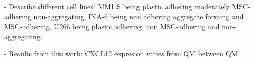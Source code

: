 






% 

\unnsubsection{\cadddiversitytitle}%
\label{sec:discussion_cadddiversity}%

- Describe different cell lines: MM1.S being plastic adhering moderately
MSC-adhering non-aggregating, INA-6 being non adhering aggregate forming and
MSC-adhering, U266 being plastic adhering, non MSC-adhering and
non-aggregating.

- Results from this work: CXCL12 expresion varies from QM between QM

